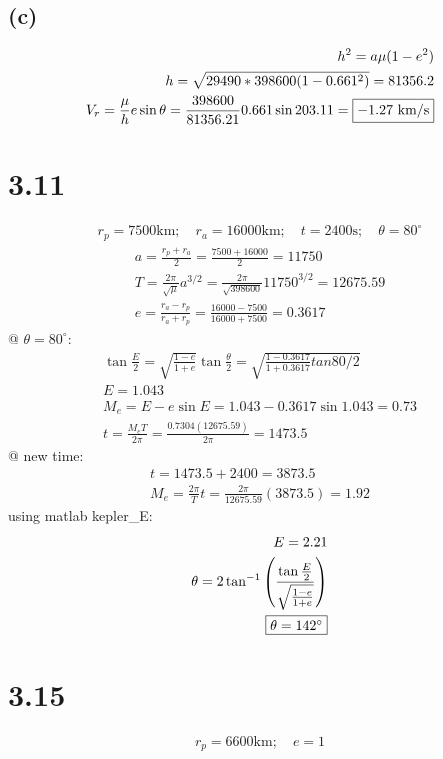 \documentclass[12 pt]{article}
\begin{document}
\subsection*{(c)}
\begin{align*}
    h^2=a\mu(1-e^2) \\
    h=\sqrt{29490*398600(1-0.661^2)}=81356.2 \\
    V_r=\frac{\mu}{h}e\sin{\theta}=\frac{398600}{81356.21}0.661\sin{203.11}=\fbox{$-1.27$ km/s}
\end{align*}

\section*{3.11}
\begin{align*}
    r_p=7500\textrm{km};\quad r_a=16000\textrm{km};\quad t=2400\textrm{s};\quad \theta=80^{\circ}
\end{align*}
\begin{align*}
    a=\frac{r_p+r_a}{2}=\frac{7500+16000}{2}=11750 \\
    T=\frac{2\pi}{\sqrt{\mu}}a^{3/2}=\frac{2\pi}{\sqrt{398600}}11750^{3/2}=12675.59 \\
    e=\frac{r_a-r_p}{r_a+r_p}=\frac{16000-7500}{16000+7500}=0.3617
\end{align*}
@ $\theta=80^{\circ}$:
\begin{align*}
    \tan{\frac{E}{2}}=\sqrt{\frac{1-e}{1+e}}\tan{\frac{\theta}{2}}=\sqrt{\frac{1-0.3617}{1+0.3617}tan{80/2}} \\
    E=1.043 \\
    M_e=E-e\sin{E}=1.043-0.3617\sin{1.043}=0.73 \\
    t=\frac{M_eT}{2\pi}=\frac{0.7304(12675.59)}{2\pi}=1473.5
\end{align*}
@ new time:
\begin{align*}
    t=1473.5+2400=3873.5 \\
    M_e=\frac{2\pi}{T}t=\frac{2\pi}{12675.59}(3873.5)=1.92
\end{align*}
using matlab kepler\_E:
\begin{align*}
    E=2.21 \\
    \theta=2\tan^{-1}\left(\frac{\tan{\frac{E}{2}}}{\sqrt{\frac{1-e}{1+e}}}\right) \\
    \fbox{$\theta=142^{\circ}$}
\end{align*}

\section*{3.15}
\begin{align*}
    r_p=6600\textrm{km};\quad e=1
\end{align*}
\end{document}
